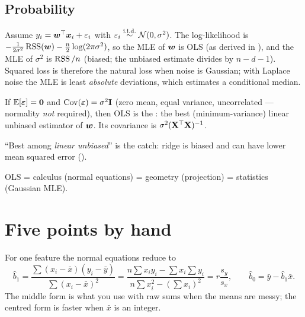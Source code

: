 \subsection{Probability}
Assume $y_i={\bm{w}}^{\top}{\bm{x}}_i+\varepsilon_i$ with $\varepsilon_i\overset{\text{i.i.d.}}{\sim}\mathcal{N}(0,\sigma^2)$. The log-likelihood is
$-\frac{1}{2\sigma^2}\operatorname{RSS}({\bm{w}})-\frac n2\log(2\pi\sigma^2)$, so the MLE of ${\bm{w}}$ is OLS (as derived in
), and the MLE of $\sigma^2$ is $\operatorname{RSS}/n$ (biased; the unbiased estimate divides by
$n-d-1$). Squared loss is therefore the natural loss when noise is Gaussian; with Laplace noise the
MLE is least \emph{absolute} deviations, which estimates a conditional median.

\begin{theorem}
	If $\mathbb{E}[\bm{\varepsilon}]={\bm{0}}$ and $\operatorname{Cov}(\bm{\varepsilon})=\sigma^2{\mathbf{I}}$ (zero mean, equal variance, uncorrelated
	--- normality \emph{not} required), then OLS is the : the best (minimum-variance)
	linear unbiased estimator of ${\bm{w}}$. Its covariance is $\sigma^2({\mathbf{X}}^{\top}{\mathbf{X}})^{-1}$.
\end{theorem}
``Best among \emph{linear unbiased}'' is the catch: ridge is biased and can have lower mean squared
error ().

\begin{moral}
	OLS = calculus (normal equations) = geometry (projection) = statistics (Gaussian MLE).
\end{moral}

\section{Five points by hand}

For one feature the normal equations reduce to
\[ \hat b_1=\frac{\sum(x_i-\bar x)(y_i-\bar y)}{\sum(x_i-\bar x)^2}
	=\frac{n\sum x_iy_i-\sum x_i\sum y_i}{n\sum x_i^2-(\sum x_i)^2}=r\frac{s_y}{s_x},
	\qquad \hat b_0=\bar y-\hat b_1\bar x. \]
The middle form is what you use with raw sums when the means are messy; the centred form is faster
when $\bar x$ is an integer.

